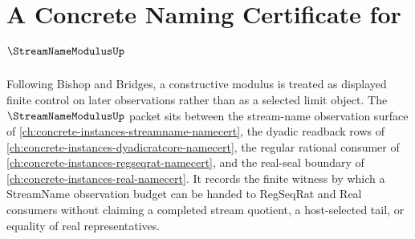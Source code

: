 \chapter{A Concrete Naming Certificate for $\StreamNameModulusUp$}
\label{ch:concrete-instances-streamname-modulus-namecert}

Following Bishop and Bridges, a constructive modulus is treated as displayed
finite control on later observations rather than as a selected limit object.
The $\StreamNameModulusUp$ packet sits between the stream-name observation
surface of \autoref{ch:concrete-instances-streamname-namecert}, the dyadic
readback rows of \autoref{ch:concrete-instances-dyadicratcore-namecert}, the
regular rational consumer of \autoref{ch:concrete-instances-regseqrat-namecert},
and the real-seal boundary of \autoref{ch:concrete-instances-real-namecert}.
It records the finite witness by which a StreamName observation budget can be
handed to RegSeqRat and Real consumers without claiming a completed stream
quotient, a host-selected tail, or equality of real representatives.

